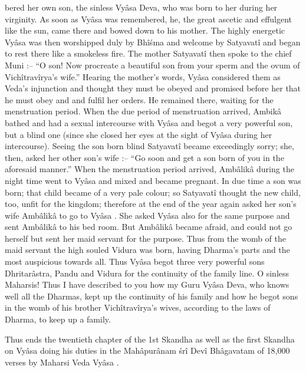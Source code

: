bered her own son, the sinless Vy\^asa  Deva, who was born to her during her virginity. As soon as Vy\^asa was remembered, he, the great ascetic and effulgent like the sun, came there and bowed down to his mother. The highly energetic Vy\^asa was then worshipped duly by Bh\^i\'sma and welcome by Satyavat\^i and began to rest there like a smokeless fire. The mother Satyavat\^i then spoke to the chief Muni :-- ``O son! Now procreate a beautiful son from your sperm and the ovum of Vich\^itrav\^irya's wife.'' Hearing the mother's words, Vy\^asa  considered them as Veda's injunction and thought they must be obeyed and promised before her that he must obey and and fulfil her orders. He remained there, waiting for the menstruation period. When the due period of menstruation arrived, Ambik\^a bathed and had a sexual intercourse with Vy\^asa  and begot a very powerful son, but a blind one (since she closed her eyes at the sight of Vy\^asa  during her intercourse). Seeing the son born blind Satyavat\^i became exceedingly sorry; she, then, asked her other son's wife :-- ``Go soon and get a son born of you in the aforesaid manner.'' When the menstruation period arrived, Amb\^alik\^a during the night time went to Vy\^asa  and mixed and became pregnant. In due time a son was born; that child became of a very pale colour; so Satyavat\^i thought the new child, too, unfit for the kingdom; therefore at the end of the year again asked her son's wife Amb\^alik\^a to go to Vy\^asa . She asked Vy\^asa  also for the same purpose and sent Amb\^alik\^a to his bed room. But Amb\^alik\^a became afraid, and could not go herself but sent her maid servant for the purpose. Thus from the womb of the maid servant the high souled Vidura was born, having Dharma's parts and the most auspicious towards all. Thus Vy\^asa  begot three very powerful sons Dhritar\^astra, Pandu and Vidura for the continuity of the family line. O sinless Maharsis! Thus I have described to you how my Guru Vy\^asa  Deva, who knows well all the Dharmas, kept up the continuity of his family and how he begot sons in the womb of his brother Vich\^itrav\^irya's wives, according to the laws of Dharma, to keep up a family.

Thus ends the twentieth chapter of the 1st Skandha as well as the first Skandha on Vy\^asa  doing his duties in the Mah\^apur\^anam \'sr\^i Dev\^i Bh\^agavatam of 18,000 verses by Maharsi Veda Vy\^asa .

